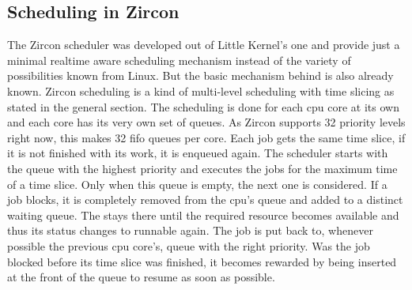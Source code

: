 \subsection{Scheduling in Zircon}
The Zircon scheduler was developed out of Little Kernel's one and provide just a minimal realtime aware scheduling mechanism instead of the variety of possibilities known from Linux.
But the basic mechanism behind is also already known.
Zircon scheduling is a kind of multi-level scheduling with time slicing as stated in the general section.
The scheduling is done for each \ac{cpu} core at its own and each core has its very own set of queues.
As Zircon supports 32 priority levels right now, this makes 32 \ac{fifo} queues per core\cite{zircon-scheduling}.
Each job gets the same time slice, if it is not finished with its work, it is enqueued again.
The scheduler starts with the queue with the highest priority and executes the jobs for the maximum time of a time slice.
Only when this queue is empty, the next one is considered.
If a job blocks, it is completely removed from the \ac{cpu}'s queue and added to a distinct waiting queue.
The stays there until the required resource becomes available and thus its status changes to runnable again.
The job is put back to, whenever possible the previous \ac{cpu} core's, queue with the right priority.
Was the job blocked before its time slice was finished, it becomes rewarded by being inserted at the front of the queue to resume as soon as possible\cite{zircon-scheduling}.

